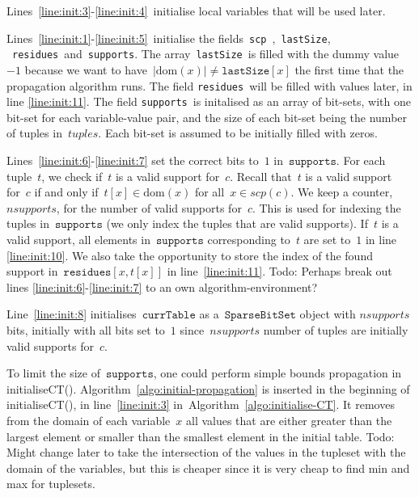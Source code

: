 \documentclass[a4paper,11pt]{article}
\newcommand{\Todo}[1]{{\color{blue}Todo: #1}}
\newcommand{\Algoref}[1]{Algorithm~\ref{#1}}
\newcommand{\Dom}[1]{\text{dom}({#1})}
\newcommand{\SparseBitSet}{\texttt{SparseBitSet}}
\newcommand{\Scp}{\texttt{scp}}
\newcommand{\CurrTable}{\texttt{currTable}}
\newcommand{\LastSizes}{\texttt{lastSize}}
\newcommand{\Supports}{\texttt{supports}}
\newcommand{\Residues}{\texttt{residues}}
\newcommand{\localvar}[1]{\mathit{#1}}
\numberwithin{equation}{section}
\begin{document}
\newcommand{\Lineref}[1]{Line~\ref{#1}}
\newcommand{\Linesref}[2]{Lines~\ref{#1}-\ref{#2}}

\Linesref{line:init:3}{line:init:4}~initialise local variables that will be 
used later.

\Linesref{line:init:1}{line:init:5}~initialise the fields~\Scp~,~\LastSizes,
~\Residues~and~\Supports.
The array~\LastSizes~is filled with 
the dummy value~$-1$ because we
want to have~$|\Dom{x}| \neq \LastSizes[x]$ the first time that the propagation
algorithm runs. The field \Residues~will be filled with values later, 
in line \ref{line:init:11}.
The field \Supports~is initalised as an array of bit-sets, with one bit-set for each
variable-value pair, and the size of each
bit-set being the number of tuples in~$\localvar{tuples}$. Each bit-set is assumed
to be initially filled with zeros.

\Linesref{line:init:6}{line:init:7} set the correct bits to~$1$ in~$\Supports$.
For each tuple~$t$, we check if~$t$ is a valid support for~$c$. Recall that~$t$ is
a valid support for~$c$ if and only if~$t[x] \in \Dom{x}$ for all~$x \in scp(c)$.
We keep a counter,~$nsupports$, for the number of valid supports for~$c$.
This is used for indexing the tuples in~$\Supports$ (we only index the tuples
that are valid supports).
If~$t$ is a valid support,
all elements in~$\Supports$ corresponding to~$t$ are set to~$1$ in
line \ref{line:init:10}. We also take the opportunity to store the index
of the found support in~$\Residues[x,t[x]]$
in line~\ref{line:init:11}.
\Todo{Perhaps break out lines \ref{line:init:6}-\ref{line:init:7} to an own algorithm-environment?}


\Lineref{line:init:8} initialises~$\CurrTable$ as a~$\SparseBitSet$ object with
$nsupports$ bits, initially with all bits set to~$1$ since~$nsupports$
number of tuples are initially valid supports for~$c$.

 
  To limit the size of~$\Supports$, one could perform simple bounds
  propagation in initialiseCT(). \Algoref{algo:initial-propagation}
  is inserted in the beginning of initialiseCT(), in line~\ref{line:init:3}
  in~\Algoref{algo:initialise-CT}. It removes
  from the domain of each variable~$x$ all values that are either greater 
  than the largest element or smaller than the smallest element in the
  initial table. \Todo{Might change later to take the intersection of the 
  values in the tupleset with the domain of the variables, but this is cheaper
  since it is very cheap to find min and max for tuplesets.}
\end{document}
